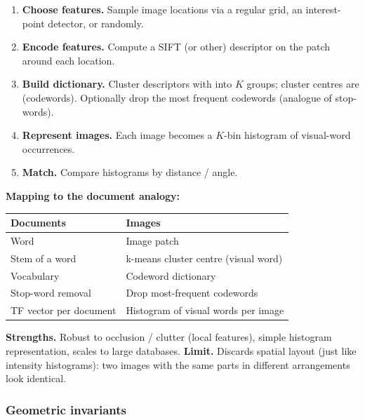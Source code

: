 \begin{defbox}
\begin{enumerate}
  \item \textbf{Choose features.} Sample image locations via a regular grid, an interest-point detector, or randomly.
  \item \textbf{Encode features.} Compute a SIFT (or other) descriptor on the patch around each location.
  \item \textbf{Build dictionary.} Cluster descriptors with  into $K$ groups; cluster centres are  (codewords). Optionally drop the most frequent codewords (analogue of stop-words).
  \item \textbf{Represent images.} Each image becomes a $K$-bin histogram of visual-word occurrences.
  \item \textbf{Match.} Compare histograms by distance / angle.
\end{enumerate}
\end{defbox}

\textbf{Mapping to the document analogy:}

\begin{center}
\renewcommand{\arraystretch}{1.3}
\begin{tabular}{@{} l l @{}}
\toprule
\textbf{Documents} & \textbf{Images} \\
\midrule
Word & Image patch \\
Stem of a word & k-means cluster centre (visual word) \\
Vocabulary & Codeword dictionary \\
Stop-word removal & Drop most-frequent codewords \\
TF vector per document & Histogram of visual words per image \\
\bottomrule
\end{tabular}
\end{center}

\textbf{Strengths.} Robust to occlusion / clutter (local features), simple histogram representation, scales to large databases. \textbf{Limit.} Discards spatial layout (just like intensity histograms): two images with the same parts in different arrangements look identical.

\bigseparator

\subsubsection{Geometric invariants}

